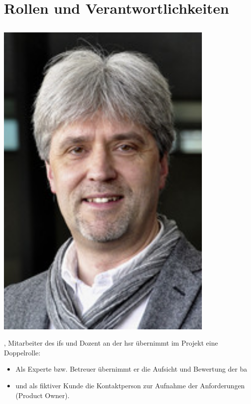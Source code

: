 \chapter{Rollen und Verantwortlichkeiten}

\section{\proff}

\begin{minipage}[t]{0.25\textwidth}
	\vspace{0pt}
	\includegraphics[width=0.8\textwidth]{fig/sfkeller}
\end{minipage}
\begin{minipage}[t]{0.8\textwidth}
	\vspace{0pt}
	\prof, Mitarbeiter des \gls{ifs} und Dozent an der \gls{hsr} übernimmt im Projekt eine Doppelrolle:
	\begin{itemize}
		\item Als Experte bzw. Betreuer übernimmt er die Aufsicht und Bewertung der \acl{ba}
		\item und als fiktiver Kunde die Kontaktperson zur Aufnahme der Anforderungen (Product Owner).
	\end{itemize}
\end{minipage}


